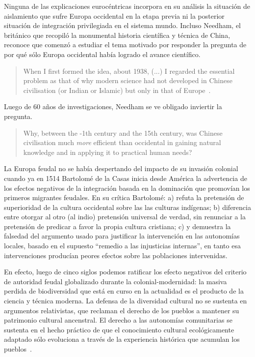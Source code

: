\documentclass[a4paper,10pt]{book}
\begin{document}

Ninguna de las explicaciones eurocéntricas incorpora en su análisis la situación de aislamiento que sufre Europa occidental en la etapa previa ni la posterior situación de integración privilegiada en el sistema mundo.
Incluso Needham, el británico que recopiló la monumental historia científica y técnica de China, reconoce que comenzó a estudiar el tema motivado por responder la pregunta de por qué sólo Europa occidental había logrado el avance científico.
\begin{quotation}
When I first formed the idea, about 1938, (...) I regarded the essential problem as that of why modern science had not developed in Chinese civilisation (or Indian or Islamic) but only in that of Europe~\cite{needham2004-generalConclusionsAndReflections}.%
\end{quotation}
Luego de 60 años de investigaciones, Needham se ve obligado inviertir la pregunta.
\begin{quotation}
Why, between the -1th century and the 15th century, was Chinese civilisation much \emph{more} efficient than occidental in gaining natural knowledge and in applying it to practical human needs?~\cite{needham2004-generalConclusionsAndReflections}
\end{quotation}


La Europa feudal no se había despertando del impacto de su invasión colonial cuando ya en 1514 Bartolomé de la Casas inicia desde América la advertencia de los efectos negativos de la integración basada en la dominación que promovían los primeros migrantes feudales.
En su crítica Bartolomé:
a) refuta la pretensión de superioridad de la cultura occidental sobre las las culturas indígenas;
b) diferencia entre otorgar al otro (al indio) pretensión universal de verdad, sin renunciar a la pretensión de predicar a favor la propia cultura cristiana;
c) y demuestra la falsedad del argumento usado para justificar la intervención en las autonomías locales, basado en el supuesto ``remedio a las injusticias internas'', en tanto esa intervenciones producían peores efectos sobre las poblaciones intervenidas.


En efecto, luego de cinco siglos podemos ratificar los efecto negativos del criterio de autoridad feudal globalizado durante la colonial-modernidad: la masiva perdida de biodiversidad que está en curso en la actualidad es el producto de la ciencia y técnica moderna.
La defensa de la diversidad cultural no se sustenta en argumentos relativistas, que reclaman el derecho de los pueblos a mantener su patrimonio cultural ancenstral.
El derecho a las autonomías comunitarias se sustenta en el hecho práctico de que el conocimiento cultural ecológicamente adaptado sólo evoluciona a través de la experiencia histórica que acumulan los pueblos~\cite{Rita}.
\end{document}
